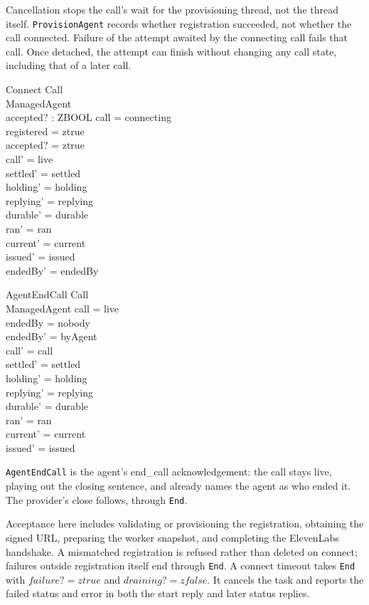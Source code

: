 \documentclass[a4paper,10pt,fleqn]{article}
\begin{document}
Cancellation stops the call's wait for the provisioning thread, not the
thread itself. \texttt{ProvisionAgent} records whether registration succeeded,
not whether the call connected. Failure of the attempt awaited by the
connecting call fails that call. Once detached, the attempt can finish
without changing any call state, including that of a later call.

\begin{schema}{Connect}
  \Delta Call \\
  \Xi ManagedAgent \\
  accepted? : ZBOOL
\where
  call = connecting \\
  registered = ztrue \\
  accepted? = ztrue \\
  call' = live \\
  settled' = settled \\
  holding' = holding \\
  replying' = replying \\
  durable' = durable \\
  ran' = ran \\
  current' = current \\
  issued' = issued \\
  endedBy' = endedBy
\end{schema}

\begin{schema}{AgentEndCall}
  \Delta Call \\
  \Xi ManagedAgent
\where
  call = live \\
  endedBy = nobody \\
  endedBy' = byAgent \\
  call' = call \\
  settled' = settled \\
  holding' = holding \\
  replying' = replying \\
  durable' = durable \\
  ran' = ran \\
  current' = current \\
  issued' = issued
\end{schema}

\texttt{AgentEndCall} is the agent's end\_call acknowledgement: the call
stays live, playing out the closing sentence, and already names the agent
as who ended it. The provider's close follows, through \texttt{End}.

Acceptance here includes validating or provisioning the registration,
obtaining the signed URL, preparing the worker snapshot, and completing the
ElevenLabs handshake. A mismatched registration is refused rather than
deleted on connect; failures outside registration itself end through
\texttt{End}. A connect timeout takes \texttt{End} with
$failure? = ztrue$ and $draining? = zfalse$. It cancels the task and
reports the failed status and error in both the start reply and later
status replies.
\end{document}
